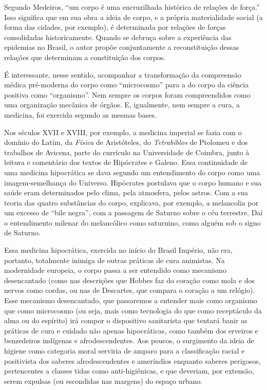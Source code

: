 \documentclass[12pt]{extarticle}
\begin{document}
Segundo Medeiros, ``um corpo é uma encruzilhada histórica de relações de
força.'' Isso significa que em sua obra a ideia de corpo, e a própria
materialidade social (a forma das cidades, por exemplo), é determinada
por relações de forças consolidadas historicamente. Quando se debruça
sobre a experiência das epidemias no Brasil, o autor propõe
conjuntamente a reconstituição dessas relações que determinam a
constituição dos corpos.

É interessante, nesse sentido, acompanhar a transformação da compreensão
médica pré-moderna do corpo como ``microcosmo'' para a do corpo da
ciência positiva como ``organismo''. Nem sempre os corpos foram
compreendidos como uma organização mecânica de órgãos. E, igualmente,
nem sempre a cura, a medicina, foi exercida segundo as mesmas bases.

Nos séculos XVII e XVIII, por exemplo, a medicina imperial se fazia com
o domínio do Latim, da \emph{Física} de Aristóteles, do
\emph{Tetrabiblos} de Ptolomeu e dos trabalhos de Avicena, parte do
currículo na Universidade de Coimbra, junto à leitura e comentário dos
textos de Hipócrates e Galeno. Essa continuidade de uma medicina
hipocrática se dava segundo um entendimento do corpo como uma
imagem-semelhança do Universo. Hipócrates postulava que o corpo humano e
sua saúde eram determinados pelo clima, pela atmosfera, pelos astros.
Com a sua teoria das quatro substâncias do corpo, explicava, por
exemplo, a melancolia por um excesso de ``bile negra'', com a passagem
de Saturno sobre o céu terrestre. Daí o entendimento milenar do
melancólico como saturnino, como alguém sob o signo de Saturno.

Essa medicina hipocrática, exercida no início do Brasil Império, não
era, portanto, totalmente inimiga de outras práticas de cura animistas.
Na modernidade europeia, o corpo passa a ser entendido como mecanismo
desencantado (como nas descrições que Hobbes faz do coração como mola e
dos nervos como cordas, ou nas de Descartes, que compara o coração a um
relógio). Esse mecanismo desencantado, que passaremos a entender mais
como organismo que como microcosmo (ou seja, mais como tecnologia do que
como receptáculo da alma ou do espírito) irá compor o dispositivo
sanitarista que tentará banir as práticas de cura e cuidado não apenas
hipocráticas, como também dos erveiros e benzedeiros indígenas e
afrodescendentes. Aos poucos, o surgimento da ideia de higiene como
categoria moral serviria de amparo para a classificação racial e
positivista dos saberes afrodescendentes e ameríndios enquanto saberes
perigosos, pertencentes a classes tidas como anti-higiênicas, e que
deveriam, por extensão, serem expulsas (ou escondidas nas margens) do
espaço urbano.
\end{document}
